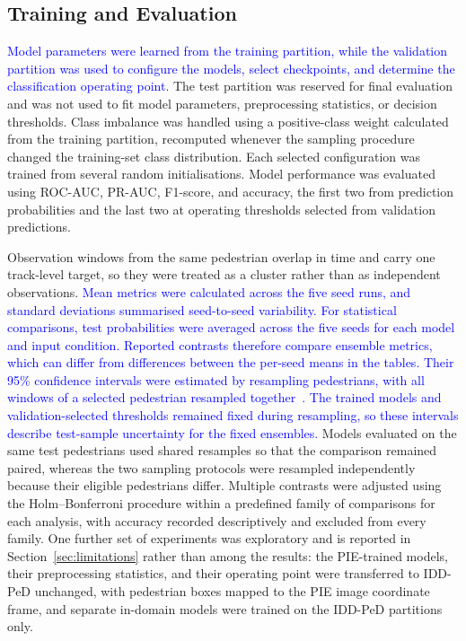 \documentclass[mti,article,submit,moreauthors]{Definitions/mdpi}
\begin{document}
\subsection{Training and Evaluation}
\label{sec:methods-training-evaluation}

\textcolor{blue}{Model parameters were learned from the training partition, while the validation partition was used to configure the models, select checkpoints, and determine the classification operating point.} The test partition was reserved for final evaluation and was not used to fit model parameters, preprocessing statistics, or decision thresholds. Class imbalance was handled using a positive-class weight calculated from the training partition, recomputed whenever the sampling procedure changed the training-set class distribution. Each selected configuration was trained from several random initialisations. Model performance was evaluated using ROC-AUC, PR-AUC, F1-score, and accuracy, the first two from prediction probabilities and the last two at operating thresholds selected from validation predictions.

Observation windows from the same pedestrian overlap in time and carry one track-level target, so they were treated as a cluster rather than as independent observations. %
\textcolor{blue}{Mean metrics were calculated across the five seed runs, and
standard deviations summarised seed-to-seed variability.
For statistical comparisons, test probabilities were averaged
across the five seeds for each model and input condition.
Reported contrasts therefore compare ensemble metrics, which
can differ from differences between the per-seed means in the
tables. Their 95\% confidence intervals were estimated by
resampling pedestrians, with all windows of a selected pedestrian
resampled together~\citep{fieldwelsh2007}.
The trained models and validation-selected thresholds remained
fixed during resampling, so these intervals describe test-sample
uncertainty for the fixed ensembles.} Models evaluated on the same test pedestrians used shared resamples so that the comparison remained paired, whereas the two sampling protocols were resampled independently because their eligible pedestrians differ. Multiple contrasts were adjusted using the Holm--Bonferroni procedure within a predefined family of comparisons for each analysis, with accuracy recorded descriptively and excluded from every family. One further set of experiments was exploratory and is reported in Section~\ref{sec:limitations} rather than among the results: the PIE-trained models, their preprocessing statistics, and their operating point were transferred to IDD-PeD unchanged, with pedestrian boxes mapped to the PIE image coordinate frame, and separate in-domain models were trained on the IDD-PeD partitions only.
\end{document}
